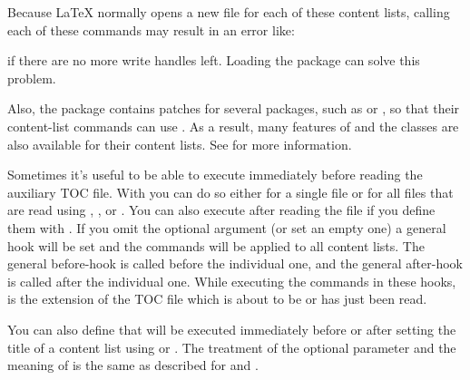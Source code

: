 Because \LaTeX{} normally opens a new file for each of
these content lists, calling each of these commands may
result in an error like:
if there are no more write handles left. Loading the
package \cite{package:scrwfile} can solve this problem.

Also, the \href{https://www.ctan.org/pkg/scrhack}{}%
%
 package
contains patches for several packages, such as
 or
, so that their content-list commands
can use . As a result, many features of 
and the \KOMAScript{} classes are also available for their content lists. See
\cite{pkg:scrhack:manual} for more information.%
\EndIndexGroup


\begin{Declaration}
\end{Declaration}
Sometimes it's useful to be able to execute  immediately
before reading the auxiliary TOC file. With  you can
do so either for a single file  or for all files that are
read using ,
, or .
You can also execute  after reading the file if you define
them with . If you omit the optional argument (or set
an empty one) a general hook will be set and the commands will be applied to
all content lists. The general before-hook is called before the individual
one, and the general after-hook is called after the individual one. While
executing the commands in these hooks,
 is the
extension of the TOC file which is about to be or has just been read.%
\EndIndexGroup


\begin{Declaration}
\end{Declaration}
You can also define  that will be executed immediately before
or after setting the title of a content list using
 or . The
treatment of the optional parameter and the meaning of
 is the same as
described for  and
.%
\EndIndexGroup



